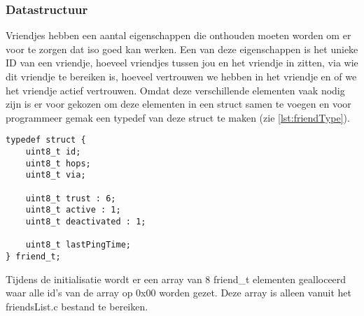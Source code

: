     \subsubsection{Datastructuur}
        Vriendjes hebben een aantal eigenschappen die onthouden moeten worden om er voor te zorgen dat iso goed kan werken. Een van deze eigenschappen is het unieke ID van een vriendje, hoeveel vriendjes tussen jou en het vriendje in zitten, via wie dit vriendje te bereiken is, hoeveel vertrouwen we hebben in het vriendje en of we het vriendje actief vertrouwen. Omdat deze verschillende elementen vaak nodig zijn is er voor gekozen om deze elementen in een struct samen te voegen en voor programmeer gemak een typedef van deze struct te maken (zie \autoref{lst:friendType}). 
\begin{lstlisting}[caption={Vriendjes struct},captionpos=b,label={lst:friendType},style=c]
typedef struct {
    uint8_t id;
    uint8_t hops;
    uint8_t via;
    
    uint8_t trust : 6;
    uint8_t active : 1;
    uint8_t deactivated : 1;
        
    uint8_t lastPingTime;
} friend_t;
\end{lstlisting}

        Tijdens de initialisatie wordt er een array van 8 friend\_t elementen gealloceerd waar alle id's van de array op 0x00 worden gezet. Deze array is alleen vanuit het friendsList.c bestand te bereiken.


